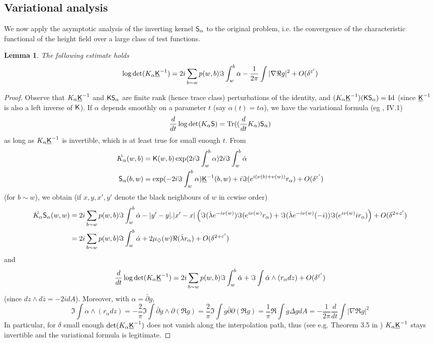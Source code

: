 \documentclass[10pt]{article}
\newcommand{\eps}{\varepsilon}
\newcommand{\rK}{{\sf K}}
\newcommand{\uK}{{\underline {\sf K}}}
\newcommand{\rS}{{\sf S}}
\newcommand{\dmd}{\diamondsuit}
\newcommand{\Lap}{\Delta\!}
\newcommand{\dbar}{\bar\partial}
\DeclareMathOperator{\Tr}{Tr}
\DeclareMathOperator{\Id}{Id}
\newtheorem{Lem}[thm]{Lemma}
\begin{document}
\subsection{Variational analysis}\label{subsec:varplane}

We now apply the asymptotic analysis of the inverting kernel $\rS_\alpha$ to the original problem, i.e. the convergence of the characteristic functional of the height field over a large class of test functions.

\begin{Lem}\label{Lem:planevariation}
The following estimate holds
$$\log\det(K_\alpha\uK^{-1})=2i\sum_{b\sim w}p(w,b)\Im\int_w^b\alpha-\frac 1{2\pi}\int |\nabla\Re g|^2+O(\delta^{\eps'})$$
\end{Lem}
\begin{proof}
Observe that $K_\alpha\uK^{-1}$ and $\rK\rS_\alpha$ are finite rank (hence trace class) perturbations of the identity, and $(K_\alpha\uK^{-1})(\rK\rS_\alpha)=\Id$ (since $\uK^{-1}$ is also a left inverse of $\rK$). If $\alpha$ depends smoothly on a parameter $t$ (say $\alpha(t)=t\alpha$), we have the variational formula (eg \cite{GohKre}, IV.1)
$$\frac {d}{dt}\log\det(K_{\alpha}\rS)=\Tr((\frac{d}{dt}K_{\alpha})\rS_{\alpha})$$
as long as $K_{\alpha}\uK^{-1}$ is invertible, which is at least true for small enough $t$. From
\begin{align*}
\dot{K_{\alpha}}(w,b)&=\rK(w,b)\exp(2i\Im\int_w^b\alpha)2i\Im\int_w^b\dot\alpha\\
\rS_{\alpha}(b,w)&=\exp(-2i\Im\int_w^b\alpha)\uK^{-1}(b,w)+i\Im(e^{i(\nu(b)+\nu(w))}r_\alpha)+O(\delta^{\eps'})
\end{align*}
(for $b\sim w$), we obtain (if $x,y,x',y'$ denote the black neighbours of $w$ in ccwise order)
\begin{align*}
\dot{K_{\alpha}}\rS_{\alpha}(w,w)&=2i\sum_{b\sim w}p(w,b)\Im\int_w^b\dot\alpha-|y'-y|.|x'-x|\left(\Im(\dot\lambda e^{-i\nu(w)})\Im(e^{i\nu(w)}r_\alpha)+\Im(\dot\lambda e^{-i\nu(w)}(-i))\Im(e^{i\nu(w)}ir_\alpha)
\right)+O(\delta^{2+\eps'})\\
&=2i\sum_{b\sim w}p(w,b)\Im\int_w^b\dot\alpha+2\mu_{\dmd}(w)\Re(\dot\lambda r_\alpha)+O(\delta^{2+\eps'})
\end{align*}
and
$$\frac {d}{dt}\log\det(K_{\alpha}\uK^{-1})=
2i\sum_{b\sim w}p(w,b)\Im\int_w^b\dot\alpha+\Im\int \dot\alpha\wedge(r_\alpha dz)+O(\delta^{\eps'})
$$
(since $dz\wedge d\bar z=-2idA$). Moreover, with $\alpha=\dbar g$, 
$$\Im\int \dot\alpha\wedge(r_\alpha dz)=-\frac 2\pi\Im\int \dbar \dot g\wedge\partial(\Re g) =\frac 2\pi\Im\int \dot g\dbar\partial(\Re g)=\frac 1\pi\Re\int \dot g\Lap g dA= -\frac 1{2\pi}\frac {d}{dt}\int |\nabla \Re g|^2$$
In particular, for $\delta$ small enough $\det(K_\alpha\uK^{-1})$ does not vanish along the interpolation path, thus (see e.g. Theorem 3.5 in \cite{SimTrace})  $K_\alpha\uK^{-1}$ stays invertible and the variational formula is legitimate.
\end{proof}
\end{document}

